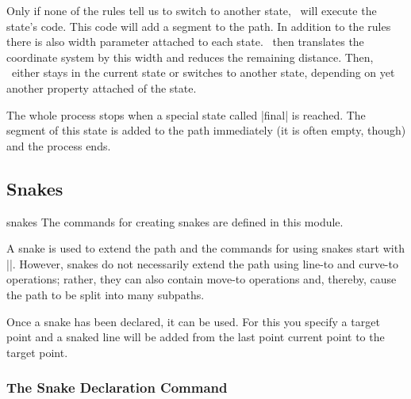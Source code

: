 Only if none of the rules tell us to switch to another
state, \pgfname\ will execute the state's code. This code will add a
segment to the path. In addition to the rules there is also width
parameter attached to each state. \pgfname\ then translates the
coordinate system by this width and reduces the remaining distance.
Then, \pgfname\ either stays in the current state or switches to
another state, depending on yet another property attached of the
state.

The whole process stops when a special state called |final| is
reached. The segment of this state is added to the path immediately
(it is often empty, though) and the process ends.


\subsection{Snakes}

\label{section-base-snakes}

\begin{pgfmodule}{snakes}
  The commands for creating snakes are defined in this module.
\end{pgfmodule}

A snake is used to extend the path and the
commands for using snakes start with |\pgfpath|. However, snakes do
not necessarily extend the path using line-to and curve-to operations;
rather, they can also contain move-to operations and, thereby, cause
the path to be split into many subpaths.

Once a snake has been declared, it can be used. For this you specify a
target point and a snaked line will be added from the last point
current point to the target point.

\subsubsection{The Snake Declaration Command}


